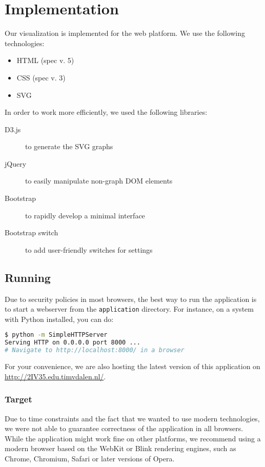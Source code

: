 \section{Implementation}\label{Sec:Imp}

	Our visualization is implemented for the web platform.
	We use the following technologies:

	\begin{itemize}
		\item HTML (spec v. 5)
		\item CSS (spec v. 3)
		\item SVG
	\end{itemize}

	In order to work more efficiently, we used the following libraries:

	\begin{description}
		\item[D3.js] to generate the SVG graphs
		\item[jQuery] to easily manipulate non-graph DOM elements
		\item[Bootstrap] to rapidly develop a minimal interface
		\item[Bootstrap switch] to add user-friendly switches for settings
	\end{description}

	\subsection{Running}
		Due to security policies in most browsers, the best way to run the application is to start a webserver from the \texttt{application} directory.
		For instance, on a system with Python installed, you can do:

		\begin{lstlisting}[language=bash]
$ python -m SimpleHTTPServer
Serving HTTP on 0.0.0.0 port 8000 ...
# Navigate to http://localhost:8000/ in a browser
		\end{lstlisting}

		For your convenience, we are also hosting the latest version of this application on \url{http://2IV35.edu.timvdalen.nl/}.

		\subsubsection{Target}
			Due to time constraints and the fact that we wanted to use modern technologies, we were not able to guarantee correctness of the application in all browsers.
			While the application might work fine on other platforms, we recommend using a modern browser based on the WebKit or Blink rendering engines, such as Chrome, Chromium, Safari or later versions of Opera.

